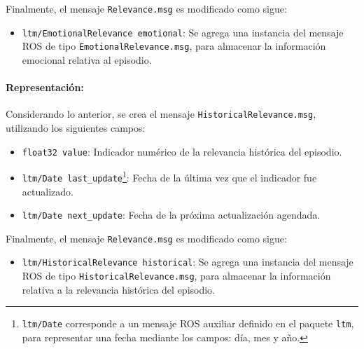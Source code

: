 Finalmente, el mensaje \texttt{Relevance.msg} es modificado como sigue:
\begin{itemize}
	\item \texttt{ltm/EmotionalRelevance emotional}: Se agrega una instancia del mensaje ROS de tipo \texttt{EmotionalRelevance.msg}, para almacenar la información emocional relativa al episodio.
\end{itemize}

\paragraph{Representación:}
Considerando lo anterior, se crea el mensaje \texttt{HistoricalRelevance.msg}, utilizando los siguientes campos:
\begin{itemize}
	\item \texttt{float32 value}: Indicador numérico de la relevancia histórica del episodio.
	\item \texttt{ltm/Date last\_update}\footnote{\texttt{ltm/Date} corresponde a un mensaje ROS auxiliar definido en el paquete \texttt{ltm}, para representar una fecha mediante los campos: día, mes y año.}: Fecha de la última vez que el indicador fue actualizado.
	\item \texttt{ltm/Date next\_update}: Fecha de la próxima actualización agendada.
\end{itemize}

Finalmente, el mensaje \texttt{Relevance.msg} es modificado como sigue:
\begin{itemize}
	\item \texttt{ltm/HistoricalRelevance historical}: Se agrega una instancia del mensaje ROS de tipo \texttt{HistoricalRelevance.msg}, para almacenar la información relativa a la relevancia histórica del episodio.
\end{itemize}

